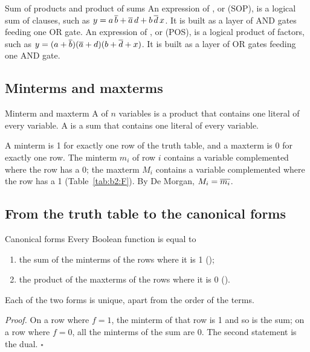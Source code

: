 \begin{definition}{Sum of products and product of sums}
An expression of , or  (SOP), is a logical
sum of clauses, such as $y=a\,\overline{b}+\overline{a}\,d+b\,\overline{d}\,x$. It is
built as a layer of AND gates feeding one OR gate. An expression of
, or  (POS), is a logical product of
factors, such as $y=(a+\overline{b})(\overline{a}+d)(b+\overline{d}+x)$. It is built as a
layer of OR gates feeding one AND gate.
\end{definition}

\subsection{Minterms and maxterms}

\begin{definition}{Minterm and maxterm}
A  of $n$ variables is a product that contains one literal of
every variable. A  is a sum that contains one literal of every
variable.
\end{definition}

A minterm is 1 for exactly one row of the truth table, and a maxterm is 0 for
exactly one row. The minterm $m_i$ of row $i$ contains a variable
complemented where the row has a 0; the maxterm $M_i$ contains a variable
complemented where the row has a 1 (Table~\ref{tab:b2:F}). By De Morgan,
$M_i=\overline{m_i}$.

\subsection{From the truth table to the canonical forms}

\begin{theorem}{Canonical forms}
Every Boolean function is equal to
\begin{enumerate}[nosep]
\item the sum of the minterms of the rows where it is 1 ();
\item the product of the maxterms of the rows where it is 0 ().
\end{enumerate}
Each of the two forms is unique, apart from the order of the terms.
\end{theorem}

\noindent\emph{Proof.} On a row where $f=1$, the minterm of that row is 1 and
so is the sum; on a row where $f=0$, all the minterms of the sum are 0. The
second statement is the dual. \hfill$\square$

